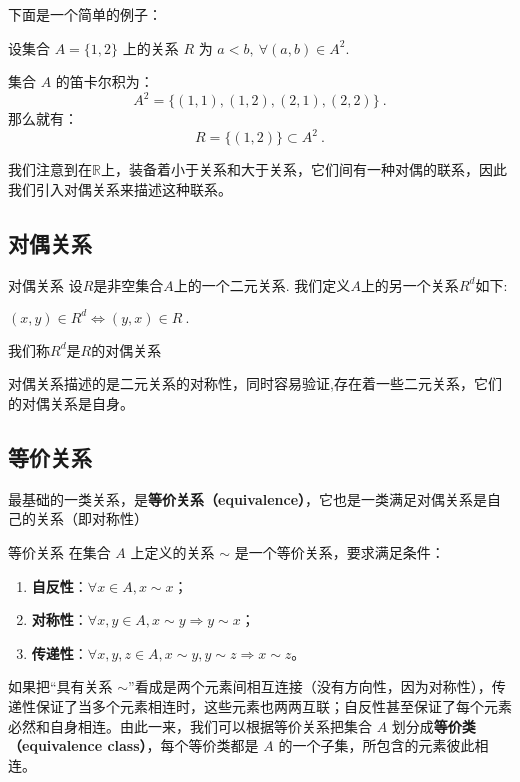 下面是一个简单的例子：

\begin{example}{}
设集合 $A=\{1,2\}$ 上的关系 $R$ 为 $a<b,\ \forall (a,b)\in A^2$.

集合 $A$ 的笛卡尔积为：
\begin{equation}
A^2 = \{(1,1),(1,2),(2,1),(2,2)\}~.
\end{equation}
那么就有：
\begin{equation}
R=\{(1,2)\}\subset A^2~.
\end{equation}

\end{example}

我们注意到在$\mathbb{R}$上，装备着小于关系和大于关系，它们间有一种对偶的联系，因此我们引入对偶关系来描述这种联系。

\subsection{对偶关系}
\begin{definition}{对偶关系}
设$R$是非空集合$A$上的一个二元关系. 我们定义$A$上的另一个关系$R^{d}$如下:

$(x, y) \in R^{d} \Leftrightarrow(y, x) \in R~.$

我们称$R^{d}$是$R$的对偶关系

\end{definition}
对偶关系描述的是二元关系的对称性，同时容易验证,存在着一些二元关系，它们的对偶关系是自身。

\subsection{等价关系}\label{sub_Relat_1}
最基础的一类关系，是\textbf{等价关系（equivalence）}，它也是一类满足对偶关系是自己的关系（即对称性） 
\begin{definition}{等价关系}\label{def_Relat_1}
在集合 $A$ 上定义的关系 $\sim$ 是一个等价关系，要求满足条件：
\begin{enumerate}
\item \textbf{自反性}：$\forall x\in A, x\sim x$；
\item \textbf{对称性}：$\forall x, y\in A, x\sim y \Rightarrow y\sim x$；
\item \textbf{传递性}：$\forall x, y, z\in A, x\sim y, y\sim z\Rightarrow x\sim z$。
\end{enumerate}
\end{definition}
如果把“具有关系 $\sim$”看成是两个元素间相互连接（没有方向性，因为对称性），传递性保证了当多个元素相连时，这些元素也两两互联；自反性甚至保证了每个元素必然和自身相连。由此一来，我们可以根据等价关系把集合 $A$ 划分成\textbf{等价类（equivalence class）}，每个等价类都是 $A$ 的一个子集，所包含的元素彼此相连。

